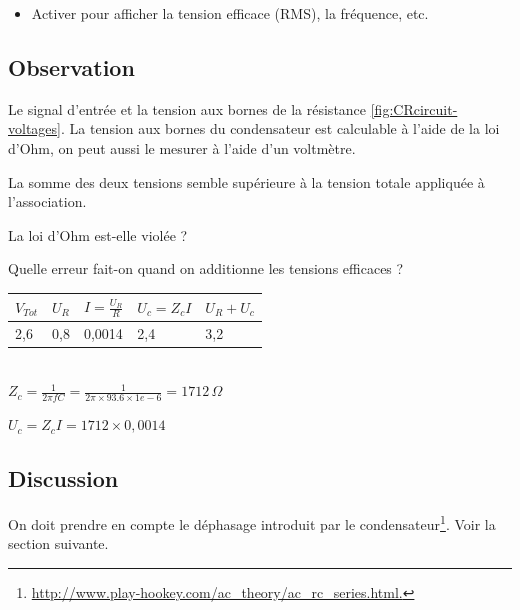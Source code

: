 \documentclass{book}
\begin{document}
\begin{itemize}
  \item Activer   pour afficher la tension efficace (RMS), la fréquence, etc.
\end{itemize}

\subsection{Observation}


Le signal d'entrée et la tension aux bornes de la résistance  \ref{fig:CRcircuit-voltages}. La tension aux bornes du condensateur est calculable à l'aide de la loi d'Ohm, on peut aussi le mesurer à l'aide d'un voltmètre.



La somme des deux tensions semble supérieure à la tension totale appliquée à l'association.



La loi d'Ohm est-elle violée ?



Quelle erreur fait-on quand on additionne les tensions efficaces ?






\begin{tabular}{|l|l|l|l|l|}
\hline
\textbf{$V_{Tot}$}&\textbf{$U_{R}$}&\textbf{$I=\frac{U_{R} }{R}$}&\textbf{$U_{c}=Z_{c}I$}&\textbf{$U_{R}+U_{c}$}
\\ \hline
2,6&0,8&0,0014&2,4&3,2
\\ \hline
\end{tabular}\\[0.5em]



$Z_{c}=\frac{1}{2\pi fC}=\frac{1}{2\pi\times93.6\times1e-6}=1712\,\Omega$



$U_{c}=Z_{c}I=1712\times0,0014$

\subsection{Discussion}


On doit prendre en compte le déphasage introduit par le condensateur\footnote{\href{http://www.play-hookey.com/ac\_theory/ac\_rc\_series.html}{\mbox{http://www.play-hookey.com/ac\_theory/ac\_rc\_series.html}.} }. Voir la section suivante.
\end{document}
